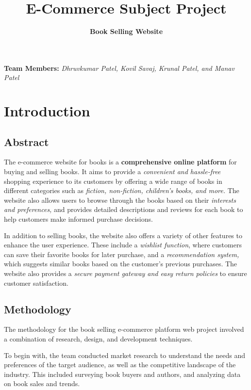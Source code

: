 \documentclass[12pt]{article}
\title{\textbf{E-Commerce Subject Project}}
\author{\textbf{Book Selling Website}}
\begin{document}
\maketitle

\textbf{Team Members:}
\newline 
\textit{Dhruvkumar Patel, Kovil Savaj, Krunal Patel, and Manav Patel}


\newpage

\tableofcontents
\newpage

\section{Introduction}

\subsection{Abstract}

The e-commerce website for books is a \textbf{comprehensive online platform} for buying and selling books. It aims to provide a \textit{convenient and hassle-free} shopping experience to its customers by offering a wide range of books in different categories such as \textit{fiction, non-fiction, children's books, and more. }The website also allows users to browse through the books based on their \textit{interests and preferences,} and provides detailed descriptions and reviews for each book to help customers make informed purchase decisions. 

In addition to selling books, the website also offers a variety of other features to enhance the user experience. These include a \textit{wishlist function}, where customers can save their favorite books for later purchase, and a \textit{recommendation system,} which suggests similar books based on the customer's previous purchases. The website also provides a \textit{secure payment gateway and easy return policies} to ensure customer satisfaction.

\subsection{Methodology}

The methodology for the book selling e-commerce platform web project involved a combination of research, design, and development techniques.

To begin with, the team conducted market research to understand the needs and preferences of the target audience, as well as the competitive landscape of the industry. This included surveying book buyers and authors, and analyzing data on book sales and trends.
\end{document}
